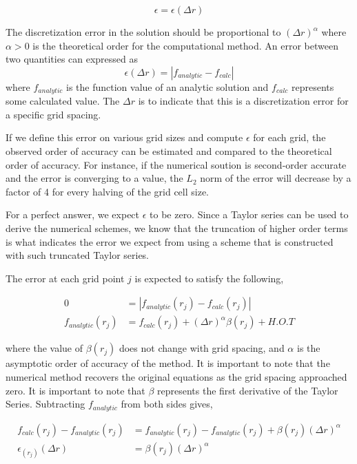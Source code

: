 \[ \epsilon = \epsilon(\Delta r) \]

The discretization error in the solution should be proportional to 
$\left( \Delta r \right)^{\alpha}$ where $\alpha > 0$ is the theoretical order
for the computational method.  An error between two quantities can expressed as 
\[ \epsilon(\Delta r) = |f_{analytic}-f_{calc}|\]
where $f_{analytic}$ is the function value of an analytic solution and $f_{calc}$ 
represents some calculated value.  The $\Delta r$ is to indicate that this is a discretization error for a
specific grid spacing. 

If we define this error on various grid sizes and compute $\epsilon$ for
each grid, the observed order of accuracy can be estimated and compared to
the theoretical order of accuracy. For instance, if the numerical soution
is second-order accurate and the error is converging to a value, the $L_2$ norm of
the error will decrease by a factor of 4 for every halving of the grid cell 
size. 

For a perfect answer, we expect $\epsilon$ to be zero. Since a Taylor series can 
be used to derive the numerical schemes, we know that the truncation of higher
order terms is what indicates the error we expect from using a scheme that 
is constructed with such truncated Taylor series.

The error at each grid point $j$ is expected to satisfy the following,

\begin{align*}
    0 &= |f_{analytic}(r_j) - f_{calc}(r_j)| \\
    f_{analytic}(r_j) &= {f}_{calc}(r_j) +
    (\Delta r)^{\alpha} \beta(r_j)  + H.O.T
\end{align*}

where the value of $\beta(r_j)$ does not change with grid spacing, and 
$\alpha$ is the asymptotic order of accuracy of the method. It is important to
note that the numerical method recovers the original equations as the grid 
spacing approached zero.  It is important to note that $\beta$ represents the
first derivative of the Taylor Series.  Subtracting $f_{analytic}$ from both
sides gives,

\begin{align*}
    f_{calc}(r_j) - f_{analytic}(r_j) &= f_{analytic}(r_j) - f_{analytic}(r_j)
    + \beta(r_j) (\Delta r)^{\alpha} \\
    \epsilon_(r_j)(\Delta r) &= \beta(r_j) (\Delta r)^{\alpha}
\end{align*}

